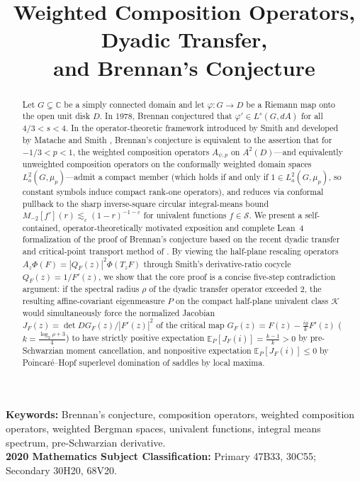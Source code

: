 \documentclass[12pt]{article}
\def\C{\mathbb{C}}
\def\K{\mathcal{K}}
\def\S{\mathcal{S}}
\def\E{\mathbb{E}}
\theoremstyle{definition}
\numberwithin{equation}{section}
\begin{document}
\title{Weighted Composition Operators, Dyadic Transfer,\\and Brennan's Conjecture}
\author{}
\date{}
\maketitle

\begin{abstract}
Let $G \subsetneq \C$ be a simply connected domain and let $\varphi : G \to D$ be a Riemann map onto the open unit disk $D$. In 1978, Brennan \cite{Bre78} conjectured that $\varphi' \in L^s(G, dA)$ for all $4/3 < s < 4$. In the operator-theoretic framework introduced by Smith \cite{Smi06} and developed by Matache and Smith \cite{MS12}, Brennan's conjecture is equivalent to the assertion that for $-1/3 < p < 1$, the weighted composition operators $A_{\psi, p}$ on $A^2(D)$---and equivalently unweighted composition operators on the conformally weighted domain spaces $L^2_a(G, \mu_p)$---admit a compact member (which holds if and only if $1 \in L^2_a(G, \mu_p)$, so constant symbols induce compact rank-one operators), and reduces via conformal pullback to the sharp inverse-square circular integral-means bound $M_{-2}[f'](r) \lesssim_\varepsilon (1-r)^{-1-\varepsilon}$ for univalent functions $f \in \S$. We present a self-contained, operator-theoretically motivated exposition and complete Lean~4 formalization of the proof of Brennan's conjecture based on the recent dyadic transfer and critical-point transport method of \cite{OAI26}. By viewing the half-plane rescaling operators $A_z \Phi(F) = |Q_F(z)|^2 \Phi(T_z F)$ through Smith's derivative-ratio cocycle $Q_F(z) = 1/F'(z)$, we show that the core proof is a concise five-step contradiction argument: if the spectral radius $\rho$ of the dyadic transfer operator exceeded $2$, the resulting affine-covariant eigenmeasure $P$ on the compact half-plane univalent class $\K$ would simultaneously force the normalized Jacobian $J_F(z) = \det DG_F(z)/|F'(z)|^2$ of the critical map $G_F(z) = F(z) - \frac{iy}{k}F'(z)$ ($k = \frac{\log_2 \rho + 3}{4}$) to have strictly positive expectation $\E_P[J_F(i)] = \frac{k-1}{k} > 0$ by pre-Schwarzian moment cancellation, and nonpositive expectation $\E_P[J_F(i)] \le 0$ by Poincar\'e--Hopf superlevel domination of saddles by local maxima.
\end{abstract}

\noindent\textbf{Keywords:} Brennan's conjecture, composition operators, weighted composition operators, weighted Bergman spaces, univalent functions, integral means spectrum, pre-Schwarzian derivative.\\
\noindent\textbf{2020 Mathematics Subject Classification:} Primary 47B33, 30C55; Secondary 30H20, 68V20.
\end{document}
